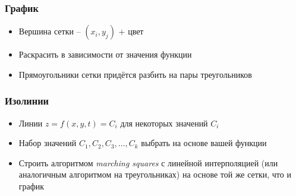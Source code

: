 \documentclass[10pt]{beamer}
\begin{document}
\begin{frame}[fragile]
\frametitle{График}
\begin{itemize}
\item Вершина сетки -- \begin{math}(x_i, y_j)\end{math} + цвет
\item Раскрасить в зависимости от значения функции
\pause
\item Прямоугольники сетки придётся разбить на пары треугольников
\end{itemize}
\end{frame}

\begin{frame}[fragile]
\frametitle{Изолинии}
\begin{itemize}
\item Линии \begin{math}z = f(x,y,t) = C_i\end{math} для некоторых значений \begin{math}C_i\end{math}
\item Набор значений \begin{math}C_1, C_2, C_3, \dots, C_k\end{math} выбрать на основе вашей функции
\pause
\item Строить алгоритмом \textit{marching squares} с линейной интерполяцией (или аналогичным алгоритмом на треугольниках) на основе той же сетки, что и график
\end{itemize}
\end{frame}
\end{document}
